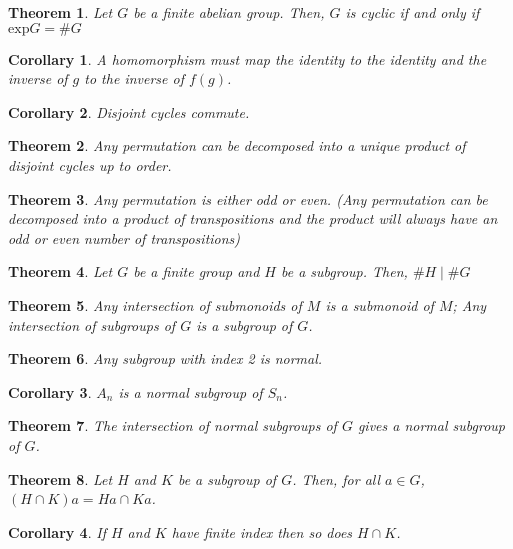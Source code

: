 \documentclass{article}
\newtheorem{theorem}{Theorem}[section]
\newtheorem{corollary}{Corollary}[section]
\theoremstyle{definition}
\begin{document}
\begin{theorem}
    Let $G$ be a finite abelian group. Then, $G$ is cyclic if and only if $\mathrm{exp}G = \#G$
\end{theorem}
\begin{corollary}
    A homomorphism must map the identity to the identity and the inverse  of $g$ to the inverse of $f(g)$.
\end{corollary}
\begin{corollary}
    Disjoint cycles commute.
\end{corollary}
\begin{theorem}
    Any permutation can be decomposed into a unique product of disjoint cycles up to order.
\end{theorem}
\begin{theorem}
    Any permutation is either odd or even. (Any permutation can be decomposed into a product of transpositions and the product will always have an odd or even number of transpositions)
\end{theorem}
\begin{theorem}
    Let $G$ be a finite group and $H$ be a subgroup. Then, $\#H \mid \#G$
\end{theorem}
\begin{theorem}
    Any intersection of submonoids of $M$ is a submonoid of $M$; Any intersection of subgroups of $G$ is a subgroup of $G$.
\end{theorem}
\begin{theorem}
    Any subgroup with index 2 is normal.
\end{theorem}
\begin{corollary}
    $A_n$ is a normal subgroup of $S_n$.
\end{corollary}
\begin{theorem}
    The intersection of normal subgroups of $G$ gives a normal subgroup of $G$.
\end{theorem}
\begin{theorem}
    Let $H$ and $K$ be a subgroup of $G$. Then, for all $a \in G$, $(H\cap K)a = Ha \cap Ka$.
\end{theorem}
\begin{corollary}
    If $H$ and $K$ have finite index then so does $H \cap K$.
\end{corollary}
\end{document}
